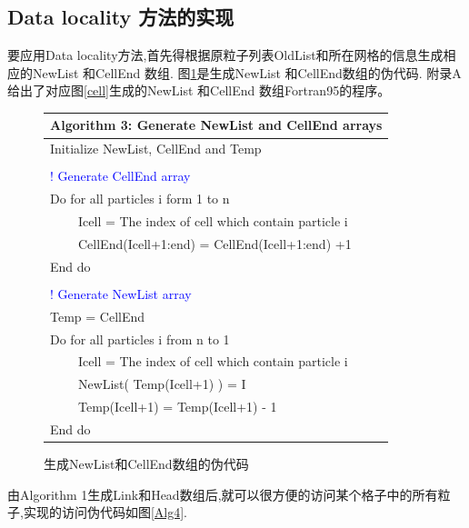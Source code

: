 \documentclass[a4paper]{article}
\begin{document}
\subsection{Data locality 方法的实现}

要应用Data locality方法,首先得根据原粒子列表OldList和所在网格的信息生成相应的NewList 和CellEnd 数组. 图\ref{newlist}是生成NewList 和CellEnd数组的伪代码. 附录A给出了对应图\ref{cell}生成的NewList 和CellEnd 数组Fortran95的程序。


\begin{figure}[!htb]
\centering
\begin{tabular}{lll}
\hline
\multicolumn{3}{|l|}{Algorithm 3:  Generate NewList and CellEnd arrays} \\
\hline
\multicolumn{3}{|l|}{Initialize NewList,  CellEnd and Temp} \\
\multicolumn{3}{|l|}{} \\
\multicolumn{3}{|l|}{\textcolor{blue}{! Generate CellEnd array}} \\
\multicolumn{3}{|l|}{Do for all particles i form 1 to n} \\
\multicolumn{1}{|l}{} &  & \multicolumn{1}{l|}{Icell = The index of cell which contain  particle i} \\
\multicolumn{1}{|l}{} &  & \multicolumn{1}{l|}{CellEnd(Icell+1:end) = CellEnd(Icell+1:end) +1} \\
\multicolumn{3}{|l|}{End do} \\
\multicolumn{3}{|l|}{} \\
\multicolumn{3}{|l|}{\textcolor{blue}{! Generate NewList array}} \\
\multicolumn{3}{|l|}{Temp = CellEnd} \\
\multicolumn{3}{|l|}{Do for all particles i from n to 1} \\
\multicolumn{1}{|l}{} &  & \multicolumn{1}{l|}{Icell = The index of cell which contain  particle i} \\
\multicolumn{1}{|l}{} &  & \multicolumn{1}{l|}{ NewList( Temp(Icell+1) ) = I} \\
\multicolumn{1}{|l}{} &  & \multicolumn{1}{l|}{Temp(Icell+1) = Temp(Icell+1)  - 1} \\
\multicolumn{3}{|l|}{End do} \\
\hline
\end{tabular}
\caption{\label{newlist}生成NewList和CellEnd数组的伪代码}
\end{figure}

由Algorithm 1生成Link和Head数组后,就可以很方便的访问某个格子中的所有粒子,实现的访问伪代码如图\ref{Alg4}.
\end{document}
